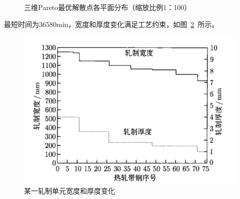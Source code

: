 \documentclass{whutmod}
\begin{document}
\begin{figure}[H]	
\centering
{}
\caption{三维Pareto最优解散点各平面分布（缩放比例1：100）}
\label{fissssg}
\end{figure}

最短时间为36580min，宽度和厚度变化满足工艺约束，如图~\ref{fisadsssg}~所示。
\begin{figure}[H]
\centering
\includegraphics[width=.8\textwidth]{figures/ad.png}
\caption{某一轧制单元宽度和厚度变化}\label{fisadsssg}
\end{figure}
\end{document}
